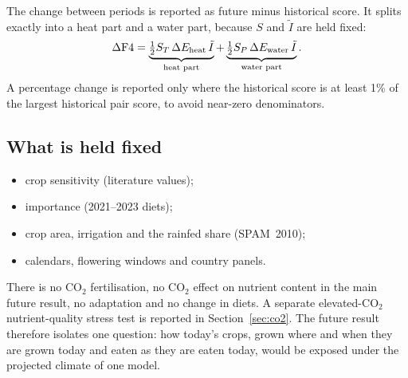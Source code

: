 The change between periods is reported as future minus historical score. It splits exactly into a heat part and
a water part, because $S$ and $\tilde I$ are held fixed:
\begin{equation}\label{eq:decomp}
\Delta\mathrm{F4} = \underbrace{\tfrac12 S_T\,\Delta E_{\text{heat}}\,\tilde I}_{\text{heat part}} + \underbrace{\tfrac12 S_P\,\Delta E_{\text{water}}\,\tilde I}_{\text{water part}} .
\end{equation}
A percentage change is reported only where the historical score is at least 1\% of the largest historical pair
score, to avoid near-zero denominators.

\subsection{What is held fixed}
\begin{itemize}
\item crop sensitivity (literature values);
\item importance (2021--2023 diets);
\item crop area, irrigation and the rainfed share (SPAM~2010);
\item calendars, flowering windows and country panels.
\end{itemize}
There is no CO$_2$ fertilisation, no CO$_2$ effect on nutrient content in the main future result, no adaptation and no
change in diets. A separate elevated-CO$_2$ nutrient-quality stress test is reported in Section~\ref{sec:co2}.
The future result therefore isolates one question: how today's crops, grown where and when they are grown today
and eaten as they are eaten today, would be exposed under the projected climate of one model.

